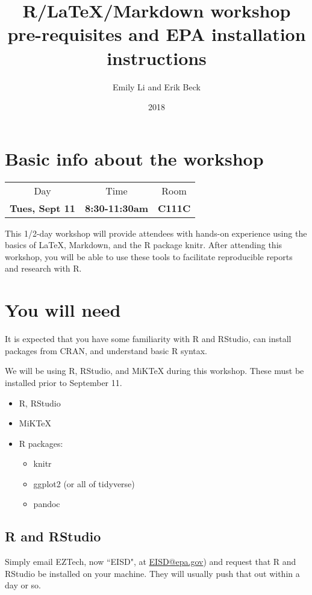 \documentclass{article}
\title{R/LaTeX/Markdown workshop pre-requisites and EPA installation instructions}
\author{Emily Li and Erik Beck}
\date{2018}
\begin{document}
\maketitle

\section{Basic info about the workshop}
\begin{center}
    \begin{tabular}{c c c}
    Day & Time & Room \\
    \textbf{Tues, Sept 11} & \textbf{8:30-11:30am} & \textbf{C111C}
\end{tabular}
\end{center}

This 1/2-day workshop will provide attendees with hands-on experience
using the basics of LaTeX, Markdown, and the R package knitr. After
attending this workshop, you will be able to use these tools to
facilitate reproducible reports and research with R.

\section{You will need}
It is expected that you have some familiarity with R and RStudio, can
install packages from CRAN, and understand basic R syntax.

We will be using R, RStudio, and MiKTeX during this workshop. These must be installed prior to September 11.
\begin{itemize}
    \item R, RStudio
    \item MiKTeX
    \item R packages:
    \begin{itemize}
        \item knitr
        \item ggplot2 (or all of tidyverse)
        \item pandoc
    \end{itemize}
\end{itemize}

\subsection{R and RStudio}
Simply email EZTech, now ``EISD", at
\href{mailto:EISD@epa.gov}{EISD@epa.gov}) and request that R and
RStudio be installed on your machine. They will usually push that out
within a day or so.
\end{document}
